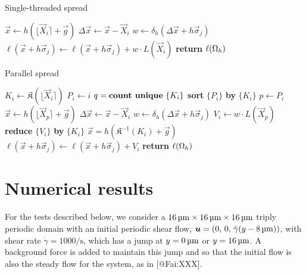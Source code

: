 \begin{algorithm}
\caption{Single-threaded spread}
\label{algo:serial-spread}
\begin{algorithmic}
    \State $\vec{x} \gets h(\lfloor\vec{X}_i\rceil+\vec{g})$
    \State $\Delta\vec{x} \gets \vec{x}-\vec{X}_i$
        \State $w \gets \delta_h(\Delta\vec{x}+h\vec{\sigma}_j)$
        \State $\ell(\vec{x}+h\vec{\sigma}_j) \gets \ell(\vec{x}+h\vec{\sigma}_j) + w \cdot L(\vec{X}_i)$
    \EndFor
\EndFor
\State \textbf{return} $\ell(\Omega_h)$
\EndProcedure
\end{algorithmic}
\end{algorithm}

\begin{algorithm}
\caption{Parallel spread}
\label{algo:par-spread}
\begin{algorithmic}
    \State $K_i \gets \mathfrak{K}(\lfloor\vec{X}_i\rceil)$
    \State $P_i \gets i$
\EndFor
\State $q = \text{\textbf{count unique} }\{K_i\}$
\State \textbf{sort} $\{P_i\}$ \textbf{by} $\{K_i\}$
        \State $p \gets P_i$
        \State $\vec{x} \gets h(\lfloor\vec{X}_p\rceil+\vec{g})$
        \State $\Delta\vec{x} \gets \vec{x}-\vec{X}_i$
        \State $w \gets \delta_h(\Delta\vec{x}+h\vec{\sigma}_j)$
        \State $V_i \gets w \cdot L(\vec{X}_p)$
    \EndFor
    \State \textbf{reduce} $\{V_i\}$ \textbf{by} $\{K_i\}$
        \State $\vec{x} = h(\mathfrak{K}^{-1}(K_i) + \vec{g})$
        \State $\ell(\vec{x} + h\vec{\sigma}_j) \gets \ell(\vec{x} + h\vec{\sigma}_j) + V_i$
    \EndFor
\EndFor
\State \textbf{return} $\ell(\Omega_h)$
\EndProcedure
\end{algorithmic}
\end{algorithm}
\egroup

\clearpage
\section{Numerical results}

For the tests described below, we consider a $16\um\times16\um\times16\um$
triply periodic domain with an initial periodic shear flow,
$\vec{u} = (0,\,0,\,\dot{\gamma}(y-8\um))$, with shear rate
$\dot{\gamma} = 1000\si{\per\second}$, which has a jump at $y=0\um$ or
$y=16\um$. A background force is added to maintain this jump and so that the
initial flow is also the steady flow for the system, as in [@Fai:XXX].

